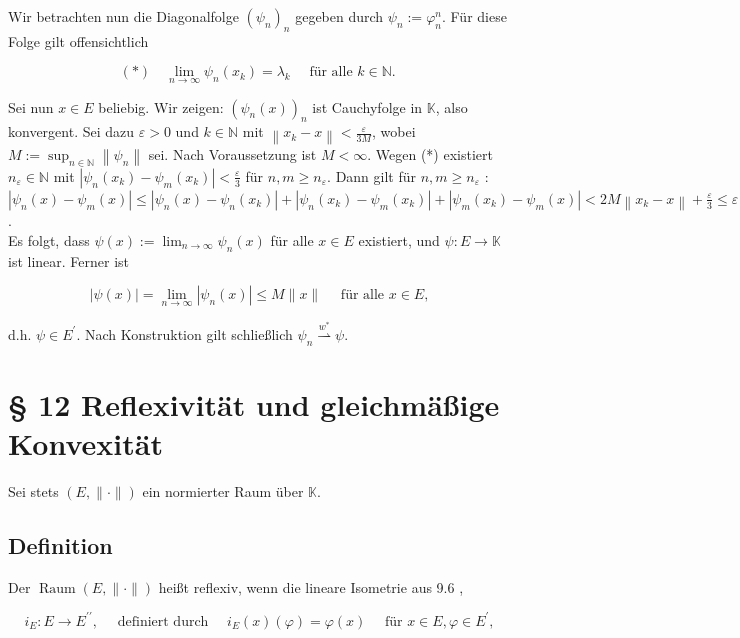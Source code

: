 \documentclass[10pt, letterpaper]{article}
\begin{document}
Wir betrachten nun die Diagonalfolge $\left(\psi_{n}\right)_{n}$ gegeben durch $\psi_{n}:=\varphi_{n}^{n}$. Für diese Folge gilt offensichtlich

$$
(*) \quad \lim _{n \rightarrow \infty} \psi_{n}\left(x_{k}\right)=\lambda_{k} \quad \text { für alle } k \in \mathbb{N} \text {. }
$$

Sei nun $x \in E$ beliebig. Wir zeigen: $\left(\psi_{n}(x)\right)_{n}$ ist Cauchyfolge in $\mathbb{K}$, also konvergent. Sei dazu $\varepsilon>0$ und $k \in \mathbb{N}$ mit $\left\|x_{k}-x\right\|<\frac{\varepsilon}{3 M}$, wobei $M:=\sup _{n \in \mathbb{N}}\left\|\psi_{n}\right\|$ sei. Nach Voraussetzung ist $M<\infty$. Wegen (*) existiert $n_{\varepsilon} \in \mathbb{N}$ mit $\left|\psi_{n}\left(x_{k}\right)-\psi_{m}\left(x_{k}\right)\right|<\frac{\varepsilon}{3}$ für $n, m \geq n_{\varepsilon}$. Dann gilt für $n, m \geq n_{\varepsilon}$ :\\
$\left|\psi_{n}(x)-\psi_{m}(x)\right| \leq\left|\psi_{n}(x)-\psi_{n}\left(x_{k}\right)\right|+\left|\psi_{n}\left(x_{k}\right)-\psi_{m}\left(x_{k}\right)\right|+\left|\psi_{m}\left(x_{k}\right)-\psi_{m}(x)\right|<2 M\left\|x_{k}-x\right\|+\frac{\varepsilon}{3} \leq \varepsilon$.\\
Es folgt, dass $\psi(x):=\lim _{n \rightarrow \infty} \psi_{n}(x)$ für alle $x \in E$ existiert, und $\psi: E \rightarrow \mathbb{K}$ ist linear. Ferner ist

$$
|\psi(x)|=\lim _{n \rightarrow \infty}\left|\psi_{n}(x)\right| \leq M\|x\| \quad \text { für alle } x \in E,
$$

d.h. $\psi \in E^{\prime}$. Nach Konstruktion gilt schließlich $\psi_{n} \stackrel{w^{*}}{\rightharpoonup} \psi$.

\section*{§ 12 Reflexivität und gleichmäßige Konvexität}
Sei stets $(E,\|\cdot\|)$ ein normierter Raum über $\mathbb{K}$.

\subsection*{Definition}
Der $\operatorname{Raum}(E,\|\cdot\|)$ heißt reflexiv, wenn die lineare Isometrie aus 9.6 ,

$$
i_{E}: E \rightarrow E^{\prime \prime}, \quad \text { definiert durch } \quad i_{E}(x)(\varphi)=\varphi(x) \quad \text { für } x \in E, \varphi \in E^{\prime},
$$
\end{document}
